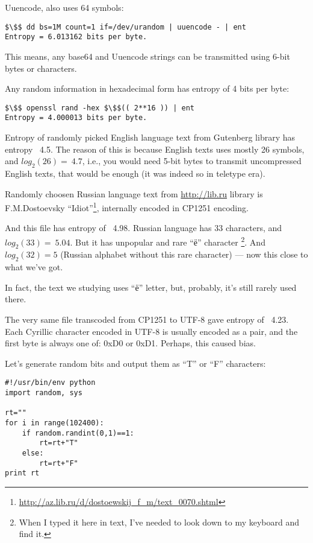 Uuencode, also uses 64 symbols:

\begin{lstlisting}[basicstyle=\ttfamily, mathescape]
$\$$ dd bs=1M count=1 if=/dev/urandom | uuencode - | ent
Entropy = 6.013162 bits per byte.
\end{lstlisting}

This means, any base64 and Uuencode strings can be transmitted using 6-bit bytes or characters.

Any random information in hexadecimal form has entropy of 4 bits per byte:

\begin{lstlisting}[basicstyle=\ttfamily, mathescape]
$\$$ openssl rand -hex $\$$(( 2**16 )) | ent
Entropy = 4.000013 bits per byte.
\end{lstlisting}

Entropy of randomly picked English language text from Gutenberg library has entropy ~4.5.
The reason of this is because English texts uses mostly 26 symbols, and $log_2(26)=~4.7$, i.e., you would need
5-bit bytes to transmit uncompressed English texts, that would be enough (it was indeed so in teletype era).

Randomly choosen Russian language text from \url{http://lib.ru}
library is F.M.Dostoevsky ``Idiot''\footnote{\url{http://az.lib.ru/d/dostoewskij_f_m/text_0070.shtml}},
internally encoded in CP1251 encoding.

And this file has entropy of ~4.98.
Russian language has 33 characters, and $log_2(33)=~5.04$.
But it has unpopular and rare ``ё'' character
\footnote{When I typed it here in text, I've needed to look down to my keyboard and find it.}.
And $log_2(32)=5$ (Russian alphabet without this rare character) --- now this close to what we've got.

In fact, the text we studying uses ``ё'' letter, but, probably, it's still rarely used there.

The very same file transcoded from CP1251 to UTF-8 gave entropy of ~4.23.
Each Cyrillic character encoded in UTF-8 is usually encoded as a pair,
and the first byte is always one of: 0xD0 or 0xD1.
Perhaps, this caused bias.

Let's generate random bits and output them as ``T'' or ``F'' characters:

\begin{lstlisting}
#!/usr/bin/env python
import random, sys

rt=""
for i in range(102400):
    if random.randint(0,1)==1:
        rt=rt+"T"
    else:
        rt=rt+"F"
print rt
\end{lstlisting}

